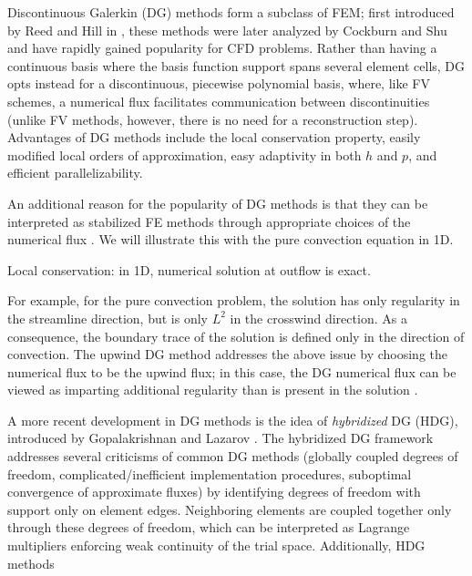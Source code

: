 \documentclass{report}
\begin{document}
Discontinuous Galerkin (DG) methods form a subclass of FEM; first introduced by Reed and Hill in \cite{Reed:73}, these methods were later analyzed by Cockburn and Shu \cite{CockburnShu:DG} and have rapidly gained popularity for CFD problems. Rather than having a continuous basis where the basis function support spans several element cells, DG opts instead for a discontinuous, piecewise polynomial basis, where, like FV schemes, a numerical flux facilitates communication between discontinuities (unlike FV methods, however, there is no need for a reconstruction step). Advantages of DG methods include the local conservation property, easily modified local orders of approximation, easy adaptivity in both $h$ and $p$, and efficient parallelizability. 

An additional reason for the popularity of DG methods is that they can be interpreted as stabilized FE methods through appropriate choices of the numerical flux . We will illustrate this with the pure convection equation in 1D.  

Local conservation: in 1D, numerical solution at outflow is exact.


For example, for the pure convection problem, the solution has only regularity in the streamline direction, but is only $L^2$ in the crosswind direction. As a consequence, the boundary trace of the solution is defined only in the direction of convection. The upwind DG method addresses the above issue by choosing the numerical flux to be the upwind flux; in this case, the DG numerical flux can be viewed as imparting additional regularity than is present in the solution \cite{DPG1,DPG3}. 

A more recent development in DG methods is the idea of \emph{hybridized} DG (HDG), introduced by Gopalakrishnan and Lazarov \cite{hybridDG}. The hybridized DG framework addresses several criticisms of common DG methods (globally coupled degrees of freedom, complicated/inefficient implementation procedures, suboptimal convergence of approximate fluxes) by identifying degrees of freedom with support only on element edges. Neighboring elements are coupled together only through these degrees of freedom, which can be interpreted as Lagrange multipliers enforcing weak continuity of the trial space. Additionally, HDG methods 
\end{document}
